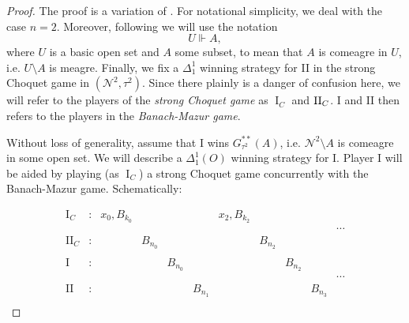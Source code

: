 \documentclass[11pt, english]{article}
\DeclareMathOperator{\I}{I}
\newcommand{\baire}{\mathscr N}
\newcommand{\forces}{\Vdash}
\begin{document}
\begin{proof}
The proof is a variation of \cite[Theorem 4.2.1]{kechris73}. For
notational simplicity, we deal with the case $n=2$. Moreover,
following \cite[Definition 8.25]{kechris95} we will use the
notation
$$
U\forces A,
$$
where $U$ is a basic open set and $A$ some subset, to mean that
$A$ is comeagre in $U$, i.e. $U\setminus A$ is meagre. Finally, we
fix a $\Delta^1_1$ winning strategy for II in the strong Choquet
game in $(\baire^2,\tau^2)$. Since there plainly is a danger of
confusion here, we will refer to the players of the {\it strong
Choquet game} as $\I_C$ and $\operatorname{II}_C$. I and II then refers to the
players in the {\it Banach-Mazur game}.

Without loss of generality, assume that I wins
$G_{\tau^2}^{**}(A)$, i.e. $\baire^2\setminus A$ is comeagre in
some open set. We will describe a $\Delta^1_1(O)$ winning strategy
for I. Player I will be aided by playing (as $\I_C$) a strong
Choquet game concurrently with the Banach-Mazur game.
Schematically:

$$
\begin{array}{lrlllllllll}
\mathrm{I}_C & :  & x_0, B_{k_0} & \       & \        & \        & x_2, B_{k_2} &      &  \\
               &         &         &          &          &         &      &           &  & &\cdots\\
\mathrm{II}_C&: & \       & B_{n_0} & \        &          &         & B_{n_2}          &  \\
\\

\mathrm{I}&:    & \       & \       & B_{n_0}  &  \       &         &      &  B_{n_2}  &   & \\
               &         &         &          &          &         &      &           &   & &\cdots\\
\mathrm{II}&:   &         &         &          & B_{n_1}  &         &      &           &  B_{n_3} &  \\

\end{array}
$$



\end{proof}
\end{document}

